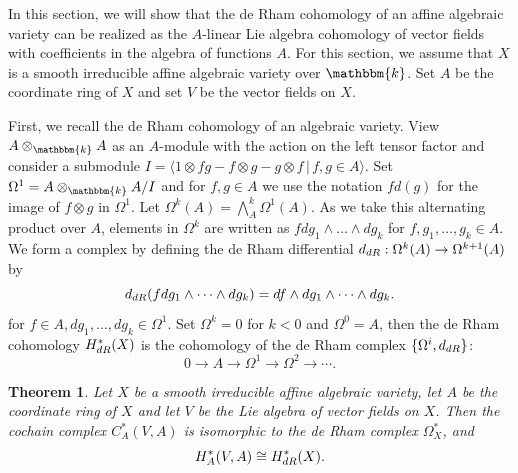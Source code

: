 \documentclass[12pt]{amsart}
\renewcommand{\k}{{\mathbbm{k}}}
\newcommand{\DR}{{\textup{dR}}}
\newtheorem{theorem}{Theorem}[section]
\theoremstyle{definition}
\begin{document}
In this section, we will show that the de Rham cohomology of an affine algebraic variety can be realized as the $A$-linear Lie algebra cohomology of vector fields with coefficients in the algebra of functions $A$. For this section, we assume that $X$ is a smooth irreducible affine algebraic variety over $\k$. Set $A$ be the coordinate ring of $X$ and set $V$ be the vector fields on $X$. 

First, we recall the de Rham cohomology of an algebraic variety. View $A \otimes_\k A$ as an $A$-module with the action on the left tensor factor and consider a submodule $I = \langle 1 \otimes fg  - f \otimes g - g \otimes f \,\big|\, f,g \in A\rangle$. Set $\Omega^1 = A \otimes_\k A /I$ and for $f, g \in A$ we use the notation $f d(g)$ for the image of $f \otimes g$ in $\Omega^1$. Let $\Omega^k (A) = \bigwedge^k_A \Omega^1 (A)$. As we take this alternating product over $A$, elements in $\Omega^k$ are written as $f dg_1\wedge \dots \wedge dg_k$ for $f, g_1, \dots, g_k \in A$. We form a complex by defining the de Rham differential $d_{\DR}: \Omega^k(A) \rightarrow \Omega^{k+1}(A)$ by
\[
d_{\DR}(f dg_1 \wedge \cdots \wedge d g_k) = df \wedge dg_1 \wedge \cdots \wedge dg_k. 
\]
for $f \in A, dg_1, \dots, dg_k \in \Omega^1$. Set $\Omega^{k}=0$ for $k < 0$ and $\Omega^0 =A$, then the de Rham cohomology $H^*_{\DR}(X)$ is the cohomology of the de Rham complex $\{ \Omega^i, d_{\DR}\}$:
\[
0 \rightarrow A \rightarrow \Omega^1 \rightarrow \Omega^2 \rightarrow \cdots.
\] 


\begin{theorem}\label{theorem:derhamcohomology}
Let $X$ be a smooth irreducible affine algebraic variety, let $A$ be the coordinate ring of $X$ and let $V$ be the Lie algebra of vector fields on $X$. Then the cochain complex $C_A^* (V, A)$ is isomorphic to the de Rham complex $\Omega^*_X$, and
\[
H^*_A(V,A) \cong H^*_{\DR}(X).
\]
\end{theorem}
\end{document}
